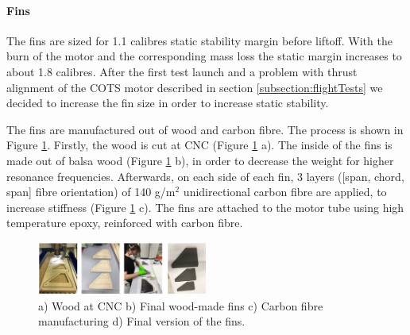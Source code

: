 

\paragraph{Fins}
\hfill \break
The fins are sized for 1.1 calibres static stability margin before liftoff.
With the burn of the motor and the corresponding mass loss the static margin increases to about 1.8 calibres.
After the first test launch and a problem with thrust alignment of the COTS motor described in section \ref{subsection:flightTests} we decided to increase the fin size in order to increase static stability.

The fins are manufactured out of wood and carbon fibre. The process is shown in Figure \ref{f:fins}. Firstly, the wood is cut at CNC (Figure \ref{f:fins} a). The inside of the fins is made out of balsa wood (Figure \ref{f:fins} b), in order to decrease the weight for higher resonance frequencies. Afterwards, on each side of each fin, 3 layers ([span, chord, span] fibre orientation) of 140 g/m$^2$ unidirectional carbon fibre are applied, to increase stiffness (Figure \ref{f:fins} c). The fins are attached to the motor tube using high temperature epoxy, reinforced with carbon fibre.
    \begin{figure}[h!]
        \centering
        \includegraphics[width=0.5\textwidth]{img/fins.jpg}
        \caption{a) Wood at CNC b) Final wood-made fins c) Carbon fibre manufacturing d) Final version of the fins.}
        \label{f:fins}
    \end{figure}

